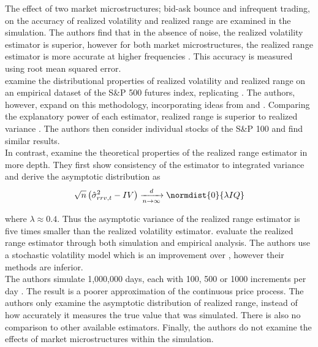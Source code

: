 \documentclass[12pt]{article}
\begin{document}
The effect of two market microstructures; bid-ask bounce and infrequent trading, on the accuracy of realized
volatility and realized range are examined in the simulation. The authors find that in the absence of noise,
the realized volatility estimator is superior, however for both market microstructures, the realized range
estimator is more accurate at higher frequencies \citep{Martens2007}. This accuracy is measured using root
mean squared error. \\

\citeauthor{Martens2007} examine the distributional properties of realized volatility and realized range on an
empirical dataset of the S\&P 500 futures index, replicating \citet{Andersen2001a}. The authors, however,
expand on this methodology, incorporating ideas from \citet{Beckers1983} and \citet{Fleming2003}. Comparing
the explanatory power of each estimator, realized range is superior to realized variance
\citep{Martens2007}. The authors then consider individual stocks of the S\&P 100 and find similar results. \\

In contrast, \citet{Christensen2007} examine the theoretical properties of the realized range estimator in
more depth. They first show consistency of the estimator to integrated variance and derive the asymptotic
distribution as
\begin{align*}
  \sqrt{n} \left( \hat{\sigma}_{rrv,t}^2 - IV \right) \xrightarrow[n \to \infty]{d} \normdist{0}{\lambda IQ}
\end{align*}

where $\lambda \approx 0.4$. Thus the asymptotic variance of the realized range estimator is five times
smaller than the realized volatility estimator. \citeauthor{Christensen2007} evaluate the realized range
estimator through both simulation and empirical analysis. The authors use a stochastic volatility model which
is an improvement over \citet{Martens2007}, however their methods are inferior. \\

The authors simulate 1,000,000 days, each with 100, 500 or 1000 increments per day
\citep{Christensen2007}. The result is a poorer approximation of the continuous price process. The authors
only examine the asymptotic distribution of realized range, instead of how accurately it measures the true
value that was simulated. There is also no comparison to other available estimators. Finally, the authors do
not examine the effects of market microstructures within the simulation. \\
\end{document}
